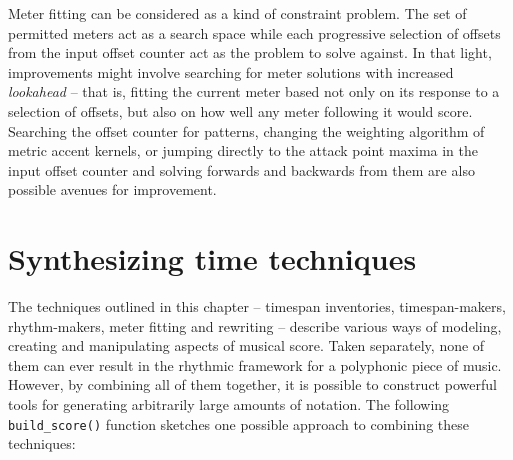 Meter fitting can be considered as a kind of constraint problem. The set of
permitted meters act as a search space while each progressive selection of
offsets from the input offset counter act as the problem to solve against. In
that light, improvements might involve searching for meter solutions with
increased \emph{lookahead} -- that is, fitting the current meter based not only
on its response to a selection of offsets, but also on how well any meter
following it would score. Searching the offset counter for patterns, changing
the weighting algorithm of metric accent kernels, or jumping directly to the
attack point maxima in the input offset counter and solving forwards and
backwards from them are also possible avenues for improvement.

\section{Synthesizing time techniques}
\label{sec:synthesizing-time-techniques}

The techniques outlined in this chapter -- timespan inventories,
timespan-makers, rhythm-makers, meter fitting and rewriting -- describe various
ways of modeling, creating and manipulating aspects of musical score. Taken
separately, none of them can ever result in the rhythmic framework for a
polyphonic piece of music. However, by combining all of them together, it is
possible to construct powerful tools for generating arbitrarily large amounts
of notation. The following \texttt{build\_score()} function sketches one
possible approach to combining these techniques:

\begin{comment}
<abjadextract dissertation.py.time_tools:build_score />[strip_prompt]
\end{comment}

